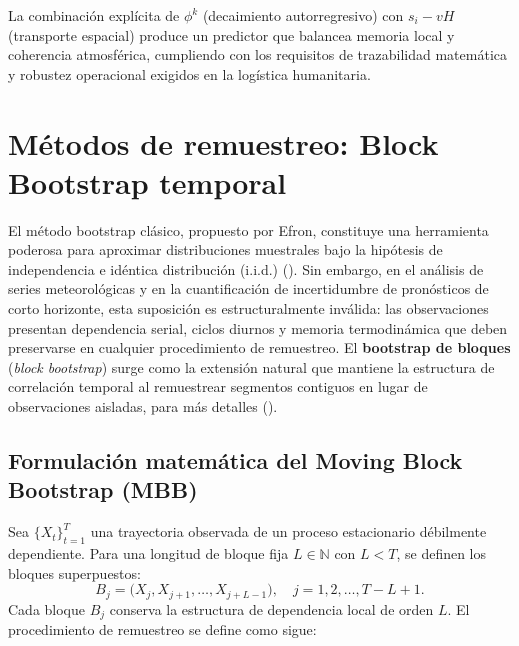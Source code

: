 \documentclass[
  spanish,
  us-letterpaper,
]{scrreprt}
\numberwithin{equation}{section}
\begin{document}
La combinación explícita de \(\phi^k\) (decaimiento autorregresivo) con
\(s_i - vH\) (transporte espacial) produce un predictor que balancea
memoria local y coherencia atmosférica, cumpliendo con los requisitos de
trazabilidad matemática y robustez operacional exigidos en la logística
humanitaria.

\section{Métodos de remuestreo: Block Bootstrap
temporal}\label{sec-blockbootstrap}

El método bootstrap clásico, propuesto por Efron, constituye una
herramienta poderosa para aproximar distribuciones muestrales bajo la
hipótesis de independencia e idéntica distribución (i.i.d.)
(). Sin embargo, en el
análisis de series meteorológicas y en la cuantificación de
incertidumbre de pronósticos de corto horizonte, esta suposición es
estructuralmente inválida: las observaciones presentan dependencia
serial, ciclos diurnos y memoria termodinámica que deben preservarse en
cualquier procedimiento de remuestreo. El \textbf{bootstrap de bloques}
(\emph{block bootstrap}) surge como la extensión natural que mantiene la
estructura de correlación temporal al remuestrear segmentos contiguos en
lugar de observaciones aisladas, para más detalles
().

\subsection{Formulación matemática del Moving Block Bootstrap
(MBB)}\label{formulaciuxf3n-matemuxe1tica-del-moving-block-bootstrap-mbb}

Sea \(\{X_t\}_{t=1}^T\) una trayectoria observada de un proceso
estacionario débilmente dependiente. Para una longitud de bloque fija
\(L \in \mathbb{N}\) con \(L < T\), se definen los bloques superpuestos:
\[
B_j = \big(X_j, X_{j+1}, \dots, X_{j+L-1}\big), \quad j = 1, 2, \dots, T-L+1.
\] Cada bloque \(B_j\) conserva la estructura de dependencia local de
orden \(L\). El procedimiento de remuestreo se define como sigue:
\end{document}
